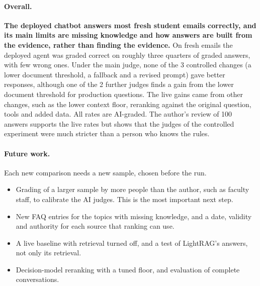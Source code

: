 \paragraph{Overall.} \textbf{The deployed chatbot answers most fresh student emails correctly, and its main limits are missing knowledge and how answers are built from the evidence, rather than finding the evidence.} On fresh emails the deployed agent was graded correct on roughly three quarters of graded answers, with few wrong ones. Under the main judge, none of the 3 controlled changes (a lower document threshold, a fallback and a revised prompt) gave better responses, although one of the 2 further judges finds a gain from the lower document threshold for production questions. The live gains came from other changes, such as the lower context floor, reranking against the original question, tools and added data. All rates are AI-graded. The author's review of 100 answers supports the live rates but shows that the judges of the controlled experiment were much stricter than a person who knows the rules.

\paragraph{Future work.} Each new comparison needs a new sample, chosen before the run.
\begin{itemize}
  \item Grading of a larger sample by more people than the author, such as faculty staff, to calibrate the AI judges. This is the most important next step.
  \item New FAQ entries for the topics with missing knowledge, and a date, validity and authority for each source that ranking can use.
  \item A live baseline with retrieval turned off, and a test of LightRAG's answers, not only its retrieval.
  \item Decision-model reranking with a tuned floor, and evaluation of complete conversations.
\end{itemize}
